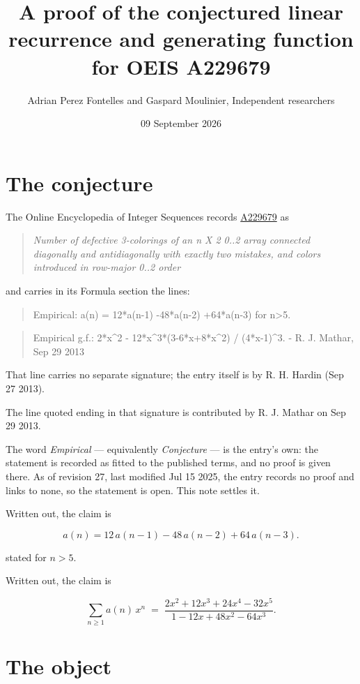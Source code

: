 \documentclass[11pt]{article}
\title{A proof of the conjectured linear recurrence and generating function for OEIS A229679}
\author{Adrian Perez Fontelles and Gaspard Moulinier, Independent researchers}
\date{09 September 2026}
\theoremstyle{definition}
\begin{document}
\maketitle
\section{The conjecture}

The Online Encyclopedia of Integer Sequences records \href{https://oeis.org/A229679}{A229679} as

\begin{quote}\itshape Number of defective 3-colorings of an n X 2 0..2 array connected diagonally and antidiagonally with exactly two mistakes, and colors introduced in row-major 0..2 order\end{quote}

and carries in its Formula section the lines:

\begin{quote}\ttfamily Empirical: a(n) = 12*a(n-1) -48*a(n-2) +64*a(n-3) for n>5.\end{quote}

\begin{quote}\ttfamily Empirical g.f.: 2*x\textasciicircum{}2 - 12*x\textasciicircum{}3*(3-6*x+8*x\textasciicircum{}2) / (4*x-1)\textasciicircum{}3. - R. J. Mathar, Sep 29 2013\end{quote}

That line carries no separate signature; the entry itself is by R. H. Hardin (Sep 27 2013).

The line quoted ending in that signature is contributed by R. J. Mathar on Sep 29 2013.

The word {\itshape Empirical} --- equivalently {\itshape Conjecture} --- is the entry's own: the statement is recorded as fitted to the published terms, and no proof is given there. As of revision 27, last modified Jul 15 2025, the entry records no proof and links to none, so the statement is open. This note settles it.

Written out, the claim is

\[a(n) = 12\,a(n-1) - 48\,a(n-2) + 64\,a(n-3).\]

stated for $n > 5$.

Written out, the claim is

\[\sum_{n \ge 1} a(n)\,x^n \;=\; \frac{2x^{2} + 12x^{3} + 24x^{4} - 32x^{5}}{1 - 12x + 48x^{2} - 64x^{3}}.\]

\section{The object}
\end{document}
